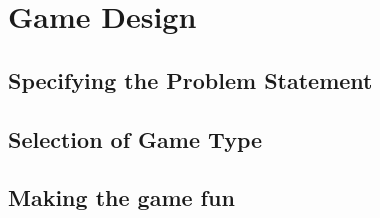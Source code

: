 \chapter{Game Design}


\section{Specifying the Problem Statement}\label{sec:specifyingtheproblemstatement}

\section{Selection of Game Type}


\section{Making the game fun}
